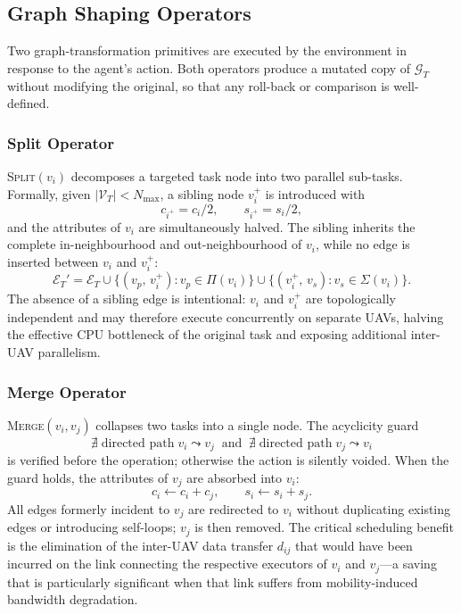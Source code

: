 \subsection{Graph Shaping Operators}
\label{subsec:operators}

Two graph-transformation primitives are executed by the environment
in response to the agent's action.
Both operators produce a mutated copy of $\mathcal{G}_T$ without
modifying the original, so that any roll-back or comparison is
well-defined.

\subsubsection*{Split Operator}

\textsc{Split}$(v_i)$ decomposes a targeted task node into
two parallel sub-tasks.
Formally, given $|\mathcal{V}_T| < N_{\max}$, a sibling node
$v_i^{+}$ is introduced with
\begin{equation}
  c_{i^{+}} = c_i/2,\qquad s_{i^{+}} = s_i/2,
  \label{eq:split_attr}
\end{equation}
and the attributes of $v_i$ are simultaneously halved.
The sibling inherits the complete in-neighbourhood and
out-neighbourhood of $v_i$, while no edge is inserted between
$v_i$ and $v_i^{+}$:
\begin{equation}
  \mathcal{E}_T' = \mathcal{E}_T
    \cup \bigl\{(v_p,\, v_i^{+}) : v_p \in \Pi(v_i)\bigr\}
    \cup \bigl\{(v_i^{+},\, v_s) : v_s \in \Sigma(v_i)\bigr\}.
  \label{eq:split_edges}
\end{equation}
The absence of a sibling edge is intentional:
$v_i$ and $v_i^{+}$ are topologically independent and may therefore
execute concurrently on separate UAVs,
halving the effective CPU bottleneck of the original task and
exposing additional inter-UAV parallelism.

\subsubsection*{Merge Operator}

\textsc{Merge}$(v_i, v_j)$ collapses two tasks into a single node.
The acyclicity guard
\begin{equation}
  \nexists\;\text{directed path}\;v_i \leadsto v_j
  \;\;\text{and}\;\;
  \nexists\;\text{directed path}\;v_j \leadsto v_i
  \label{eq:cycle_guard}
\end{equation}
is verified before the operation; otherwise the action is silently
voided.
When the guard holds, the attributes of $v_j$ are absorbed into
$v_i$:
\begin{equation}
  c_i \leftarrow c_i + c_j,\qquad s_i \leftarrow s_i + s_j.
  \label{eq:merge_attr}
\end{equation}
All edges formerly incident to $v_j$ are redirected to $v_i$
without duplicating existing edges or introducing self-loops;
$v_j$ is then removed.
The critical scheduling benefit is the elimination of the
inter-UAV data transfer $d_{ij}$ that would have been incurred on
the link connecting the respective executors of $v_i$ and $v_j$—a
saving that is particularly significant when that link suffers from
mobility-induced bandwidth degradation.

